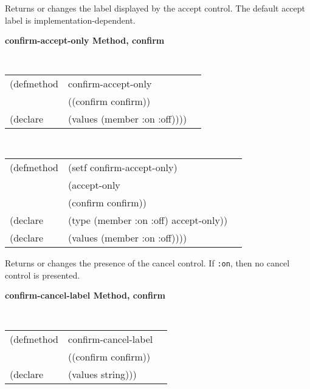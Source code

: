 \begin{flushright} \parbox[t]{6.125in}{
Returns or changes the label displayed by the accept control. The default accept
label is implementation-dependent.

}\end{flushright}


{\samepage
{\large {\bf confirm-accept-only \hfill Method, confirm}}
\begin{flushright} \parbox[t]{6.125in}{
\tt
\begin{tabular}{lll}
\raggedright
(defmethod & confirm-accept-only & \\
           & ((confirm  confirm)) \\
(declare & (values (member :on :off))))
\end{tabular}
\rm

}\end{flushright}}

{\samepage
\begin{flushright} \parbox[t]{6.125in}{
\tt
\begin{tabular}{lll}
\raggedright
(defmethod & (setf confirm-accept-only) & \\
         & (accept-only \\
         & (confirm confirm)) \\
(declare &(type (member :on :off)  accept-only))\\
(declare & (values (member :on :off))))
\end{tabular}
\rm
}
\end{flushright}}

\begin{flushright} \parbox[t]{6.125in}{
Returns or changes the presence of the cancel control. If {\tt :on}, then no
cancel control is presented.

}\end{flushright}

{\samepage
{\large {\bf confirm-cancel-label \hfill Method, confirm}}
\begin{flushright} \parbox[t]{6.125in}{
\tt
\begin{tabular}{lll}
\raggedright
(defmethod & confirm-cancel-label & \\
           & ((confirm  confirm)) \\
(declare & (values string)))
\end{tabular}
\rm

}\end{flushright}}

